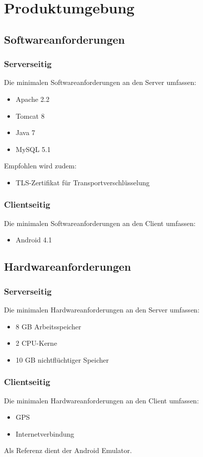 \section{Produktumgebung}
\subsection{Softwareanforderungen}

\subsubsection{Serverseitig}
Die minimalen Softwareanforderungen an den Server umfassen:
\begin{itemize}
\item Apache 2.2
\item Tomcat 8
\item Java 7
\item MySQL 5.1

\end{itemize}

Empfohlen wird zudem:
\begin{itemize}
\item TLS-Zertifikat für Transportverschlüsselung
\end{itemize}

\subsubsection{Clientseitig}
Die minimalen Softwareanforderungen an den Client umfassen:
\begin{itemize}
\item Android 4.1

\end{itemize}


\subsection{Hardwareanforderungen}
\subsubsection{Serverseitig}
Die minimalen Hardwareanforderungen an den Server umfassen:
\begin{itemize}
\item 8 GB Arbeitsspeicher
\item 2 CPU-Kerne
\item 10 GB nichtflüchtiger Speicher
\end{itemize}

\subsubsection{Clientseitig}
Die minimalen Hardwareanforderungen an den Client umfassen:
\begin{itemize}
\item GPS
\item Internetverbindung
\end{itemize}

Als Referenz dient der Android Emulator.

